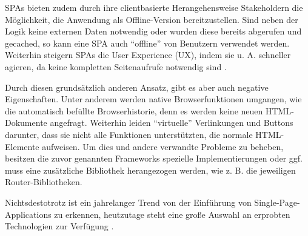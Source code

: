 SPAs bieten zudem durch ihre clientbasierte Herangehensweise Stakeholdern die Möglichkeit, die Anwendung als Offline-Version bereitzustellen. Sind neben der Logik keine externen Daten notwendig oder wurden diese bereits abgerufen und gecached, so kann eine SPA auch \enquote{offline} von Benutzern verwendet werden. Weiterhin steigern SPAs die User Experience (UX), indem sie u. A. schneller agieren, da keine kompletten Seitenaufrufe notwendig sind \cite{ImprovementOfAcedemicServiceBasedOnSPA}.

Durch diesen grundsätzlich anderen Ansatz, gibt es aber auch negative Eigenschaften. Unter anderem werden native Browserfunktionen umgangen, wie die automatisch befüllte Browserhistorie, denn es werden keine neuen HTML-Dokumente angefragt. Weiterhin leiden \enquote{virtuelle} Verlinkungen und Buttons darunter, dass sie nicht alle Funktionen unterstützten, die normale HTML-Elemente aufweisen. Um dies und andere verwandte Probleme zu beheben, besitzen die zuvor genannten Frameworks spezielle Implementierungen oder ggf. muss eine zusätzliche Bibliothek herangezogen werden, wie z. B. die jeweiligen Router-Bibliotheken.

Nichtsdestotrotz ist ein jahrelanger Trend von der Einführung von Single-Page-Applications zu erkennen, heutzutage steht eine große Auswahl an erprobten Technologien zur Verfügung \cite{TheStateOfJavaScript2020}.


